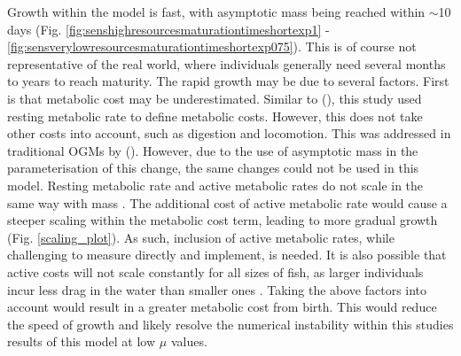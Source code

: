 \documentclass[a4paper, 11pt, hidelinks]{article} %
\begin{document}

	Growth within the model is fast, with asymptotic mass being reached within $\sim$10 days (Fig. \ref{fig:senshighresourcesmaturationtimeshortexp1} - \ref{fig:sensverylowresourcesmaturationtimeshortexp075}).
	This is of course not representative of the real world, where individuals generally need several months to years to reach maturity.	
	The rapid growth may be due to several factors.  First is that metabolic cost may be underestimated.  Similar to \citeauthor{West2001} (\citeyear{West2001}), this study used resting metabolic rate to define metabolic costs.  However, this does not take other costs into account, such as digestion and locomotion.
	This was addressed in traditional OGMs by \citeauthor{Hou2008} (\citeyear{Hou2008}).  However, due to the use of asymptotic mass in the parameterisation of this change, the same changes could not be used in this model.  Resting metabolic rate and active metabolic rates do not scale in the same way with mass \parencite{Gillooly2001, Weibel2004}.  The additional cost of active metabolic rate would cause a steeper scaling within the metabolic cost term, leading to more gradual growth (Fig. \ref{scaling_plot}). 
	As such, inclusion of active metabolic rates, while challenging to measure directly and implement, is needed.  It is also possible that active costs will not scale constantly for all sizes of fish, as larger individuals incur less drag in the water than smaller ones \parencite{Muller2000}.  Taking the above factors into account would result in a greater metabolic cost from birth.  This would reduce the speed of growth and likely resolve the numerical instability within this studies results of this model at low $ \mu $ values.
	
\end{document}
